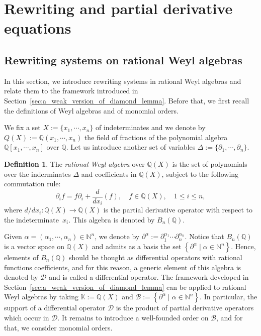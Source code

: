 \documentclass[10pt]{easychair}
\theoremstyle{definition}
\newtheorem{definition}[theorem]{Definition}
\newcommand\diff[1]{\partial_{#1}}
\newcommand\D{\mathcal{D}}
\newcommand\basis{\mathscr{B}}
\newcommand\K{\mathbb{K}}
\newcommand\Q{\mathbb{Q}}
\newcommand\N{\mathbb{N}}
\newcommand\QX{\mathbb{Q}[x_1,\cdots,x_n]}
\newcommand\QXX{\mathbb{Q}(x_1,\cdots,x_n)}
\newcommand\Weyl{B_n(\Q)}
\begin{document}
\section{Rewriting and partial derivative equations}
\label{sec:rewriting_systems_and_partial_derivative_equations}

\subsection{Rewriting systems on rational Weyl algebras}
\label{sec:rewriting_systems_on_Weyl_algebras}

In this section, we introduce rewriting systems in rational Weyl algebras
and relate them to the framework introduced in
Section~\ref{sec:a_weak_version_of_diamond_lemma}. Before that, we first
recall the definitions of Weyl algebras and of monomial orders.
\medskip

We fix a set $X:=\{x_1,\cdots,x_n\}$ of indeterminates and we denote by
$Q(X):=\QXX$ the field of fractions of the polynomial algebra $\QX$ over
$\Q$. Let us introduce another set of variables
$\Delta:=\{\diff{1},\cdots,\diff{n}\}$. 

\begin{definition}
  The {\it rational Weyl algebra} over $\Q(X)$ is the set of polynomials
  over the inderminates $\Delta$ and coefficients in $\Q(X)$, subject to
  the following commutation rule:
  \[\diff{i}f=f\diff{i}+\frac{d}{dx_i}(f),\quad f\in\Q(X),\quad
  1\leq i\leq n,\]
  where $d/dx_i:\Q(X)\to\Q(X)$ is the partial derivative operator with
  respect to the indeterminate~$x_i$. This algebra is denoted by $\Weyl$.
\end{definition}

Given $\alpha=(\alpha_1,\cdots,\alpha_n)\in\N^n$, we denote by 
$\partial^{\alpha}:=\diff{1}^{\alpha_1}\cdots\diff{n}^{\alpha_n}$. Notice
that $\Weyl$ is a vector space on $\Q(X)$ and admits as a basis the set
$\left\{\partial^\alpha\mid\alpha\in\N^n\right\}$. Hence, elements of
$\Weyl$ should be thought as differential operators with rational
functions coefficients, and for this reason, a generic element of this
algebra is denoted by $\D$ and is called a differential operator. The
framework developed in Section~\ref{sec:a_weak_version_of_diamond_lemma}
can be applied to rational Weyl algebras by taking $\K:=\Q(X)$ and
$\basis:=\left\{\partial^\alpha\mid\alpha\in\N^n\right\}$. In particular,
the support of a differential operator $\D$ is the product of partial
derivative operators which occur in $\D$. It remains to introduce a
well-founded order on $\basis$, and for that, we consider monomial
orders.
\end{document}

